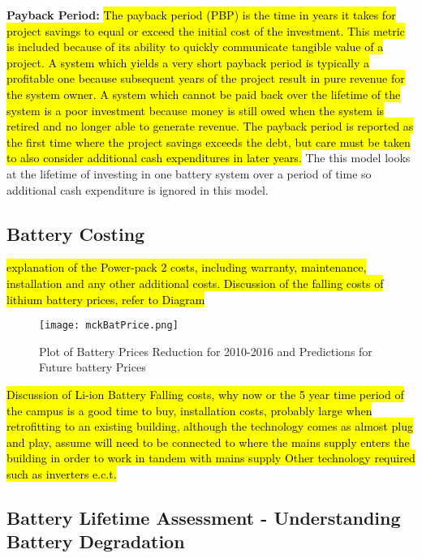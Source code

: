 \textbf{Payback Period:}
\hl{The payback period (PBP) is the time in years it takes for project savings to equal or exceed the initial cost of the investment. This metric is included because of its ability to quickly communicate tangible value of a project. A system which yields a very short payback period is typically a profitable one because subsequent years of the project result in pure revenue for the system owner. A system which cannot be paid back over the lifetime of the system is a poor investment because money is still owed when the system is retired and no longer able to generate revenue. The payback period is reported as the first time where the project savings exceeds the debt, but care must be taken to also consider additional cash expenditures in later years.}
\cite{diorio2015economic} The this model looks at the lifetime of
investing in one battery system over a period of time so additional cash
expenditure is ignored in this model.

\subsection{Battery Costing}\label{battery-costing}

\hl{explanation of the Power-pack 2 costs, including warranty, maintenance, installation and any other additional costs. Discussion of the falling costs of lithium battery prices, refer to Diagram}

\begin{figure}[H]
  \centering
  \texttt{[image: mckBatPrice.png]}
  \caption{Plot of Battery Prices Reduction for 2010-2016 and Predictions for Future battery Prices \cite{mckBat}}
  \label{mckBatPrice}
\end{figure}

\hl{Discussion of Li-ion Battery Falling costs, why now or the 5 year time period of the campus is a good time to buy, installation costs, probably large when retrofitting to an existing building, although the technology comes as almost plug and play, assume will need to be connected to where the mains supply enters the building in order to work in tandem with mains supply Other technology required such as inverters e.c.t.}

\subsection{Battery Lifetime Assessment - Understanding Battery
Degradation}\label{battery-lifetime-assessment---understanding-battery-degradation}

